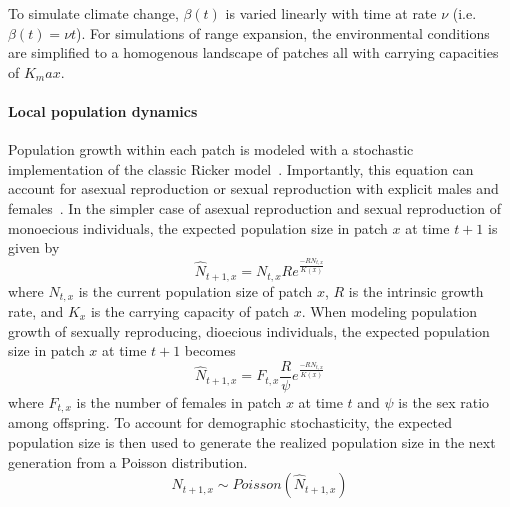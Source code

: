 \documentclass[11pt]{article}
\begin{document}
 To simulate climate change, $\beta(t)$ is varied linearly with time at rate $\nu$ (i.e. $\beta(t)=\nu t$). For simulations of range expansion, the environmental conditions are simplified to a homogenous landscape of patches all with carrying capacities of $K_max$. 

\paragraph{Local population dynamics}
Population growth within each patch is modeled with a stochastic implementation of the classic Ricker model~\citep{ricker1954stock, melbourne2008extinction}. Importantly, this equation can account for asexual reproduction or sexual reproduction with explicit males and females~\citep{melbourne2008extinction}. In the simpler case of asexual reproduction and sexual reproduction of monoecious individuals, the expected population size in patch $x$ at time $t+1$ is given by
\begin{equation}
\hat{N}_{t+1,x}=N_{t,x}Re^{\frac{-RN_{t,x}}{K(x)}}
\end{equation}
where $N_{t,x}$ is the current population size of patch $x$, $R$ is the intrinsic growth rate, and $K_{x}$ is the carrying capacity of patch $x$. When modeling population growth of sexually reproducing, dioecious individuals, the expected population size in patch $x$ at time $t+1$ becomes
\begin{equation}
\hat{N}_{t+1,x}=F_{t,x}\frac{R}{\psi}e^{\frac{-RN_{t,x}}{K(x)}}
\end{equation}
where $F_{t,x}$ is the number of females in patch $x$ at time $t$ and $\psi$ is the sex ratio among offspring. To account for demographic stochasticity, the expected population size is then used to generate the realized population size in the next generation from a Poisson distribution.
\begin{equation}
N_{t+1,x}\sim Poisson(\hat{N}_{t+1,x})
\end{equation}
\end{document}
